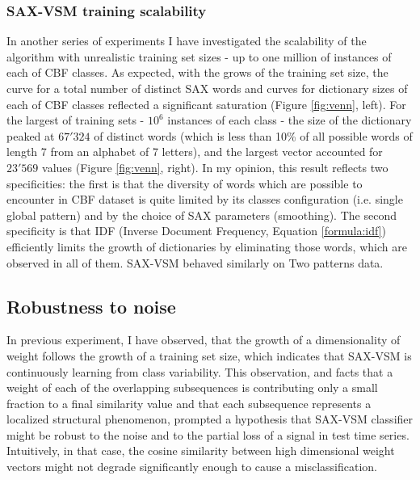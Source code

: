 \subsubsection{SAX-VSM training scalability }
In another series of experiments I have investigated the scalability of the algorithm with
unrealistic training set sizes - up to one million of instances of each of CBF classes.
As expected, with the grows of the training set size, the curve for a total number of distinct SAX
words and curves for dictionary sizes of each of CBF classes reflected a significant saturation 
(Figure \ref{fig:venn}, left). For the largest of training sets - $10^6$ instances of each
class - the size of the dictionary peaked at $67'324$ of distinct words (which is less than 10\% of
all possible words of length 7 from an alphabet of 7 letters), 
and the largest \tfidf vector accounted for $23'569$ values (Figure \ref{fig:venn}, right). 
In my opinion, this result reflects two specificities: the first is that the diversity of words which 
are possible to encounter in CBF dataset is quite limited by its classes configuration (i.e. single global 
pattern) and by the choice of SAX parameters (smoothing). 
The second specificity is that IDF (Inverse Document Frequency, Equation \ref{formula:idf})
efficiently limits the growth of dictionaries by eliminating those words, which are observed in all
of them. SAX-VSM behaved similarly on Two patterns data.

\subsection{Robustness to noise}
In previous experiment, I have observed, that the growth of a dimensionality of \tfidf weight follows the growth 
of a training set size, which indicates that SAX-VSM is continuously learning from class variability.
This observation, and facts that a weight of each of the overlapping subsequences is contributing only 
a small fraction to a final similarity value and that each subsequence represents a localized structural phenomenon,
prompted a hypothesis that SAX-VSM classifier might be robust to the noise and to the partial loss of a signal in
test time series. Intuitively, in that case, the cosine similarity between high dimensional weight vectors might 
not degrade significantly enough to cause a misclassification.

